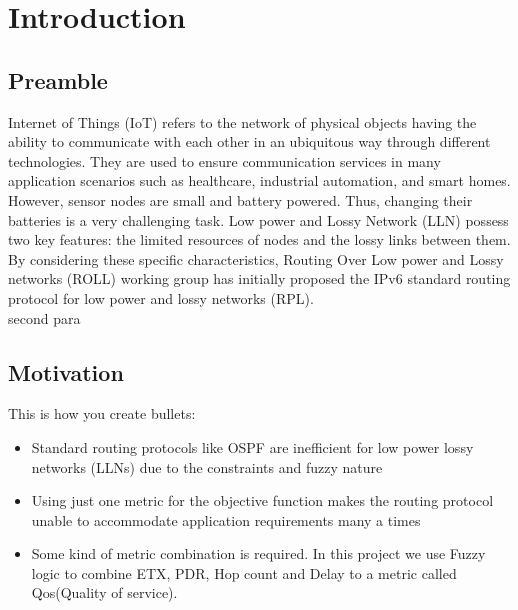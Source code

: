 \chapter{Introduction} \label{Introduction}
\section{Preamble} \label{Preamble}
\noindent Internet of Things (IoT) refers to the network of physical objects having the ability to communicate with each other in an ubiquitous way through different technologies. They are used to ensure communication services in many application scenarios such as healthcare, industrial automation, and smart homes. However, sensor nodes are small and battery powered. Thus, changing their batteries is a very challenging task. Low power and Lossy Network (LLN) possess two key features: the limited resources of nodes and the lossy links between them. By considering these specific characteristics, Routing Over Low power and Lossy networks (ROLL) working group has initially proposed the IPv6 standard routing protocol for low power and lossy networks (RPL).\\
\noindent second para\\
\section{Motivation}\label{Motivation}
\noindent This is how you create bullets:\\
\vspace{-1cm}
\begin{itemize}
\item Standard routing protocols like OSPF are inefficient for low power lossy networks (LLNs) due to the constraints and fuzzy nature
\item Using just one metric for the objective function makes the routing protocol unable to accommodate application requirements many a times
\item Some kind of metric combination is required. In this project we use Fuzzy logic to combine ETX, PDR, Hop count and Delay to a metric called Qos(Quality of service).

\end{itemize}
